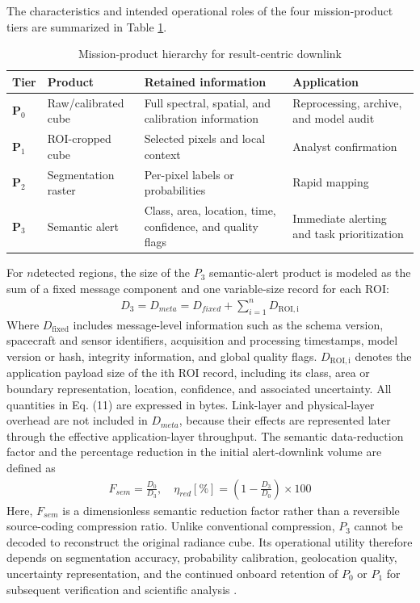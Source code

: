 \documentclass[a4paper,fleqn]{cas-dc}
\begin{document}
The characteristics and intended operational roles of the four mission-product tiers are summarized in Table \ref{tab:mproduct}.
\begin{table}[htb]
	\small
	\centering
	\caption{Mission-product hierarchy for result-centric downlink}
	\label{table:hsispecs}
	\begin{threeparttable} 
		\begin{tabularx}{\linewidth}{l X l l} 
			\toprule\toprule
			\textbf{Tier} & \textbf{Product} & \textbf{Retained information}  & \textbf{Application}\\ 
			\midrule
			\(\mathbf{P}_0\) & Raw/calibrated cube &Full spectral, spatial, and calibration information & Reprocessing, archive, and model audit\\
			\(\mathbf{P}_1\) & ROI-cropped cube & Selected pixels and local context & Analyst confirmation\\
			\(\mathbf{P}_2\) & Segmentation raster & Per-pixel labels or probabilities & Rapid mapping\\
			\(\mathbf{P}_3\) & Semantic alert & Class, area, location, time, confidence, and quality flags & Immediate alerting and task prioritization\\
			\bottomrule\bottomrule
		\end{tabularx}
	\end{threeparttable}
	 \label{tab:mproduct}
\end{table}
For \(n\)detected regions, the size of the \(P_3\) semantic-alert product is modeled as the sum of a fixed message component and one variable-size record for each ROI:
\begin{eqnarray}
	D_3 = D_{meta} = D_{fixed} + \sum_{i=1}^{n}D_{\mathrm{ROI, i}}
\end{eqnarray}
Where \(D_{\mathrm{fixed}}\) includes message-level information such as the schema version, spacecraft and sensor identifiers, acquisition and processing timestamps, model version or hash, integrity information, and global quality flags. \(D_{\mathrm{ROI, i}}\) denotes the application payload size of the ith ROI record, including its class, area or boundary representation, location, confidence, and associated uncertainty. All quantities in Eq. (11) are expressed in bytes. Link-layer and physical-layer overhead are not included in \(D_{meta}\), because their effects are represented later through the effective application-layer throughput.
The semantic data-reduction factor and the percentage reduction in the initial alert-downlink volume are defined as
\begin{eqnarray}
	F_{sem} = \frac{D_0}{D_3}, \quad \eta_{red}[\%] = \left(1- \frac{D_3}{D_0}\right) \times 100
\end{eqnarray}
Here, \(F_{sem}\) is a dimensionless semantic reduction factor rather than a reversible source-coding compression ratio. Unlike conventional compression, \(P_3\) cannot be decoded to reconstruct the original radiance cube. Its operational utility therefore depends on segmentation accuracy, probability calibration, geolocation quality, uncertainty representation, and the continued onboard retention of \(P_0\) or \(P_1\) for subsequent verification and scientific analysis \cite{langer2023robust, giordano2017roi}.
\end{document}
